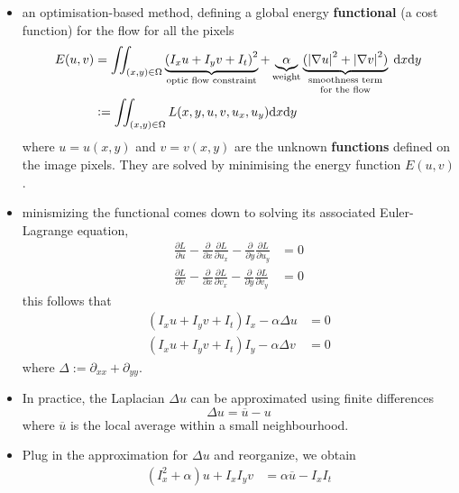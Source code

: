 \documentclass[twocolumn,landscape,10pt]{article}
\theoremstyle{definition}
\begin{document}
\begin{itemize}
    \item an optimisation-based method, defining a global energy
        \textbf{functional} (a cost function) for the flow for all the pixels
        \begin{align*}
            E(u,v)
            & =\iint_{(x,y)\in\Omega}
            \underbrace{{(I_xu+I_yv+I_t)}^{2}}_{\text{optic flow constraint}}
            +
            \underbrace{\alpha}_\text{weight}
            \underbrace{({|\nabla u|}^{2}+{|\nabla v|}^{2})}_
            \text{\shortstack{smoothness term \\for the flow}}
            \;\mathrm{d}x\mathrm{d}y \\
            & :=\iint_{(x,y)\in\Omega}L(x,y,u,v,u_x,u_y)\mathrm{d}x\mathrm{d}y
        \end{align*} 
        where $u=u(x,y)$ and $v=v(x,y)$ are the unknown \textbf{functions} 
        defined on the image pixels.
        They are solved by minimising the energy function $E(u,v)$.
    \item minismizing the functional comes down to solving its associated
        Euler-Lagrange equation,
        \begin{align*}
            \frac{\partial L}{\partial u}-\frac{\partial}{\partial
            x}\frac{\partial L}{\partial u_x}-\frac{\partial}{\partial
            y}\frac{\partial L}{\partial u_y} & = 0 \\
            \frac{\partial L}{\partial v}-\frac{\partial}{\partial
            x}\frac{\partial L}{\partial v_x}-\frac{\partial}{\partial
            y}\frac{\partial L}{\partial v_y} & = 0
        \end{align*} 
        this follows that
        \begin{align*}
            (I_xu+I_yv+I_t)I_x-\alpha\Delta u & = 0 \\
            (I_xu+I_yv+I_t)I_y-\alpha\Delta v & = 0
        \end{align*} 
        where $\Delta:=\partial_{xx}+\partial_{yy}$.
    \item In practice, the Laplacian $\Delta u$ can be approximated using finite
        differences
        \[
            \Delta u=\overline{u}-u
        \]
        where $\overline{u}$ is the local average within a small neighbourhood.
    \item Plug in the approximation for $\Delta u$ and reorganize, we obtain
        \begin{align*}
            (I_x^2+\alpha)u+I_xI_yv & = \alpha \overline{u}-I_xI_t \\

\end{align*}
\end{itemize}
\end{document}
